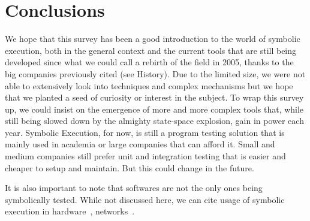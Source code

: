 \documentclass[11pt]{IEEEtran}
\begin{document}
  \section{Conclusions}
    We hope that this survey has been a good introduction to the world of symbolic execution, both in the general context and the current tools that are still being developed since what we could call a rebirth of the field in 2005, thanks to the big companies previously cited (see History). Due to the limited size, we were not able to extensively look into techniques and complex mechanisms but we hope that we planted a seed of curiosity or interest in the subject. To wrap this survey up, we could insist on the emergence of more and more complex tools that, while still being slowed down by the almighty state-space explosion, gain in power each year. Symbolic Execution, for now, is still a program testing solution that is mainly used in academia or large companies that can afford it. Small and medium companies still prefer unit and integration testing that is easier and cheaper to setup and maintain. But this could change in the future.

    It is also important to note that softwares are not the only ones being symbolically tested. While not discussed here, we can cite usage of symbolic execution in hardware~\cite{Hardware}, networks~\cite{220590}.


\pagebreak
{}

\end{document}
